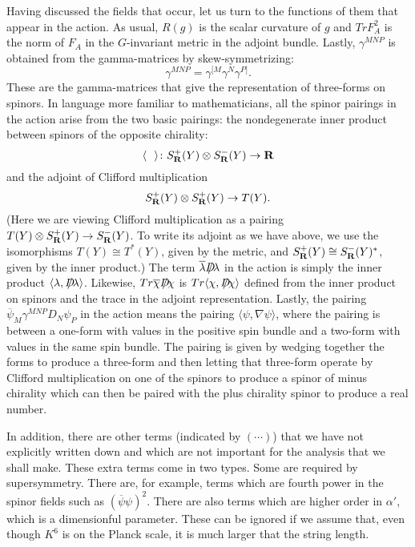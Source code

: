 Having discussed the fields that occur,  let us turn to
the functions of them that appear in the action.
As usual, $R(g)$ is the scalar curvature of $g$ and $TrF_A^2$ 
is the norm of $F_A$ in the $G$-invariant metric in the adjoint
bundle. 
Lastly, $\gamma^{MNP}$ is obtained from the gamma-matrices by
skew-symmetrizing: 
$$\gamma^{MNP}=\gamma^{[M}\gamma^N\gamma^{P]}.$$
These are the gamma-matrices that give the representation of
three-forms on spinors.  
In language more familiar to mathematicians, all the spinor pairings in
the action 
arise from the two basic pairings: the nondegenerate inner product
between spinors of the opposite chirality:
$$\langle\ \ \rangle\colon S^+_{\bf R}(Y)\otimes S^-_{\bf R}(Y)\to {\bf R}$$
and the adjoint of Clifford multiplication
\begin{equation}\label{cm}
S^+_{\bf R}(Y)\otimes S^+_{\bf R}(Y)\to T(Y).
\end{equation}
(Here we are viewing Clifford multiplication as a pairing
$T(Y)\otimes S^+_{\bf R}(Y)\to S^-_{\bf R}(Y)$. To write its adjoint
as we have above, we use the isomorphisms $T(Y)\cong T^*(Y)$, given by
the metric, and $S^+_{\bf R}(Y)\cong S^-_{\bf R}(Y)^*$, given by the
inner product.)
The term $\overline\lambda D\hskip-.67em\slash\lambda$ in the action is simply the
inner product
$\langle \lambda,D\hskip-.67em\slash\lambda\rangle$. 
Likewise, $Tr\overline\chi D\hskip-.67em\slash\chi$ is $Tr\langle
\chi,D\hskip-.67em\slash\chi\rangle$ defined from the inner product on spinors and
the trace in the adjoint representation.  Lastly, the pairing
$\overline\psi_M\gamma^{MNP}D_N\psi_P$ in the action means 
the pairing $\langle \psi,\nabla\psi\rangle$, where the pairing is
between a one-form with values in the positive spin bundle and a
two-form with values in the same spin bundle. The pairing is given by wedging
together the forms to produce a three-form and then letting that
three-form  operate by
Clifford multiplication on one of the spinors to produce a spinor of
minus chirality which can then be paired with the plus chirality
spinor to produce a real number.


In addition, there are other terms (indicated by $(\cdots)$) that we
have not explicitly written 
down and which are not important for the analysis that we shall make.
These extra terms come in two types.  Some are required by
supersymmetry.  There are, for example, terms which are 
fourth power in the spinor fields such as
$(\overline{\psi}\psi)^2$. There are also terms which are higher order
in $\alpha'$, which is a dimensionful parameter.  These can be ignored
if we assume that, even though $K^6$ is on the Planck scale, it is 
much larger that the string length.


